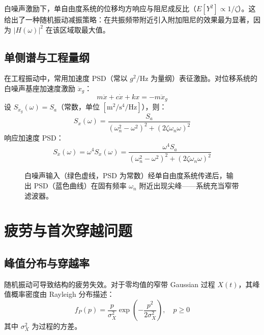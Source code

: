 \begin{remark}
白噪声激励下，单自由度系统的位移均方响应与阻尼成反比（$E[Y^{2}] \propto 1/\zeta$）。这给出了一种随机振动减振策略：在共振频带附近引入附加阻尼的效果最为显著，因为 $|H(\omega)|^{2}$ 在该区域取最大值。
\end{remark}

\subsection{单侧谱与工程量纲}
在工程振动中，常用加速度 PSD（常以 $g^{2}/\text{Hz}$ 为量纲）表征激励。对位移系统的白噪声基座加速度激励 $\ddot{x}_g$：
\[
m\ddot{x} + c\dot{x} + kx = -m\ddot{x}_g
\]
设 $S_{\ddot{x}_g}(\omega) = S_a$（常数，单位 $[\text{m}^{2}/\text{s}^{4}/\text{Hz}]$），则：
\[
S_x(\omega) = \frac{S_a}{(\omega_n^{2} - \omega^{2})^{2} + (2\zeta\omega_n\omega)^{2}}
\]
响应加速度 PSD：
\[
S_{\ddot{x}}(\omega) = \omega^{4} S_x(\omega) = \frac{\omega^{4} S_a}{(\omega_n^{2} - \omega^{2})^{2} + (2\zeta\omega_n\omega)^{2}}
\]

\begin{figure}[H]
\centering
{}
\caption{白噪声输入（绿色虚线，PSD 为常数）经单自由度系统传递后，输出 PSD（蓝色曲线）在固有频率 $\omega_n$ 附近出现尖峰——系统充当窄带滤波器。}
\label{fig:ch11_input_output_PSD}
\end{figure}

\section{疲劳与首次穿越问题}
\subsection{峰值分布与穿越率}
随机振动可导致结构的疲劳失效。对于零均值的窄带 Gaussian 过程 $X(t)$，其峰值概率密度由 Rayleigh 分布描述：
\[
f_P(p) = \frac{p}{\sigma_X^{2}}\exp\left(-\frac{p^{2}}{2\sigma_X^{2}}\right), \quad p \ge 0
\]
其中 $\sigma_X^{2}$ 为过程的方差。

